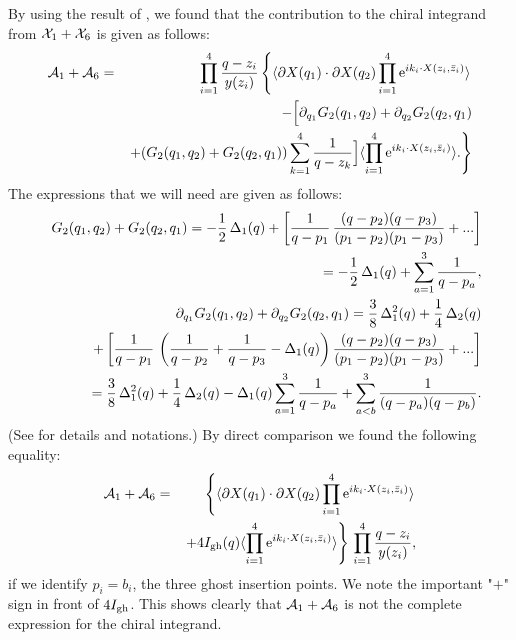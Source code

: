 \documentclass[a4paper,12pt]{article}
\begin{document}
By using the result of \cite{AllZhu3}, we found that the
contribution to the chiral integrand from ${\cal X}_1 + {\cal
X}_6$ is given as follows:
\begin{eqnarray} {\cal A}_1 + {\cal A}_6 & = &   \prod_{i=1}^4 { q -z_i\over y(z_i) }
\left\{ \langle
 \partial X(q_1)  \cdot\partial X(q_2)
\prod_{i=1}^4 \hbox{e}^{i k_i \cdot X(z_i, \bar z_i)} \rangle
\right.
\nonumber \\
& & - \Big[  \partial_{q_1}G_2(q_1,q_2) +
\partial_{q_2}G_2(q_2,q_1)
 \nonumber \\
& &  \left.  +   ( G_2(q_1,q_2) + G_2(q_2,q_1) ) \sum_{k=1}^4 { 1
\over q - z_k} \Big] \langle \prod_{i=1}^4 \hbox{e}^{i k_i \cdot
X(z_i, \bar z_i)} \rangle. \right\}
\end{eqnarray}
The expressions that we will need are given as follows:
\begin{eqnarray}
& & G_2(q_1,q_2) + G_2(q_2,q_1)  =  - {1\over 2} \, \Delta_1(q) +
\left[ { 1\over q-p_1} \, { (q-p_2)(q-p_3) \over (p_1-p_2)
(p_1-p_3)} + ... \right] \nonumber \\
& & \qquad  = - {1\over 2} \, \Delta_1(q) +
\sum_{a=1}^3 { 1\over q - p_a}, \\
& & \partial_{q_1} G_2(q_1,q_2) + \partial_{q_2} G_2(q_2,q_1)  =
{3\over 8}\, \Delta_1^2(q) + { 1\over 4}\, \Delta_2(q) \nonumber
\\
& & \qquad + \left[ {1\over q-p_1}\, \left( {1\over q-p_2} +
{1\over q-p_3} - \Delta_1(q) \right)  { (q-p_2)(q-p_3) \over
(p_1-p_2) (p_1-p_3)} + ... \right] \nonumber \\
& & = {3\over 8}\, \Delta_1^2(q) + { 1\over 4}\, \Delta_2(q) -
\Delta_1(q) \sum_{a=1}^3 { 1\over q - p_a} + \sum_{a<b}^3 {1\over
(q-p_a)(q-p_b) } .
\end{eqnarray}
(See \cite{AllZhu1, AllZhu3} for details and notations.)  By
direct comparison we found the following equality:
\begin{eqnarray}
{\cal A}_1 + {\cal A}_6  & = & \left\{ \langle  \partial X(q_1)
\cdot
\partial X(q_2)  \prod_{i=1}^4 \hbox{e}^{i k_i \cdot X(z_i, \bar
z_i)}
\rangle \right. \nonumber \\
& & \left. + 4 I_{\rm gh}(q) \langle \prod_{i=1}^4 \hbox{e}^{i k_i
\cdot X(z_i, \bar z_i)} \rangle \right\} \, \prod_{i=1}^4 { q -
z_i \over y(z_i)},
\end{eqnarray}
if we identify $p_i = b_i$, the three ghost insertion points. We
note the important "$+$" sign in front of $4I_{\rm gh}$. This
shows clearly that ${\cal A}_1 + {\cal A}_6$ is not the complete
expression for the chiral integrand.
\end{document}
